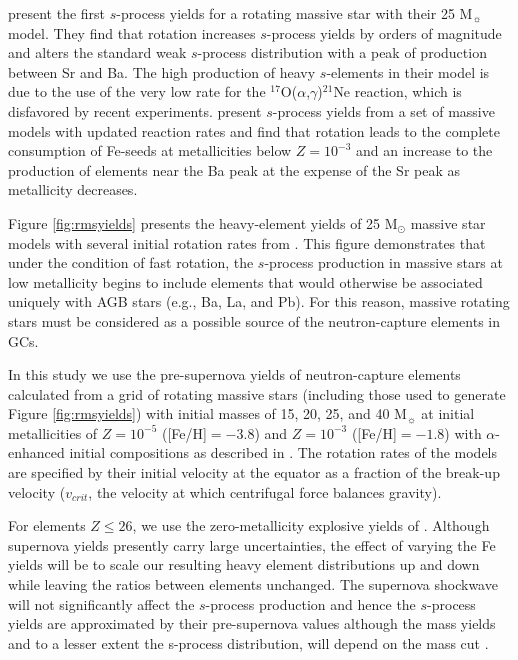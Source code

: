 \citet{Pignatari:2008ec} present the first $s$-process yields for a rotating massive star with their 25 M$_\sun$ model. They find that rotation increases $s$-process yields by orders of magnitude and alters the standard weak $s$-process distribution with a peak of production between Sr and Ba. The high production of heavy $s$-elements in their model is due to the use of the very low \citet{Descouvemont:1993kc} rate for the $^{17}$O($\alpha$,$\gamma$)$^{21}$Ne reaction, which is disfavored by recent experiments. \citet{Frischknecht:2012il} present $s$-process yields from a set of massive models with updated reaction rates and find that rotation leads to the complete consumption of Fe-seeds at metallicities below $Z=10^{-3}$ and an increase to the production of elements near the Ba peak at the expense of the Sr peak as metallicity decreases.

Figure \ref{fig:rmsyields} presents the heavy-element yields of 25 M$_\odot$ massive star models with several initial rotation rates from \citet{Frischknecht:2012il}. This figure demonstrates that under the condition of fast rotation, the $s$-process production in massive stars at low metallicity begins to include elements that would otherwise be associated uniquely with AGB stars (e.g., Ba, La, and Pb). For this reason, massive rotating stars must be considered as a possible source of the neutron-capture elements in GCs.

In this study we use the pre-supernova yields of neutron-capture elements calculated from a grid of rotating massive stars (including those used to generate Figure \ref{fig:rmsyields}) with initial masses of 15, 20, 25, and 40 M$_\sun$ at initial metallicities of $Z=10^{-5}$ ([Fe/H]$=-3.8$) and $Z=10^{-3}$ ([Fe/H]$=-1.8$) with $\alpha$-enhanced initial compositions as described in \citet{Frischknecht:2012il}. The rotation rates of the models are specified by their initial velocity at the equator as a fraction of the break-up velocity ($v_{crit}$, the velocity at which centrifugal force balances gravity).

For elements $Z \le 26$, we use the zero-metallicity explosive yields of \citet{Limongi:2012ei}. Although supernova yields presently carry large uncertainties, the effect of varying the Fe yields will be to scale our resulting heavy element distributions up and down while leaving the ratios between elements unchanged. The supernova shockwave will not significantly affect the $s$-process production and hence the $s$-process yields are approximated by their pre-supernova values although the mass yields and to a lesser extent the s-process distribution, will depend on the mass cut \citep{Tur:2009ji}.

